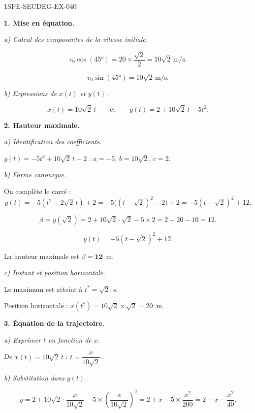 \begin{corrige}{1SPE-SECDEG-EX-040}

\textbf{1. Mise en équation.}

\textit{a) Calcul des composantes de la vitesse initiale.}


\[v_0 \cos(45°) = 20 \times \frac{\sqrt{2}}{2} = 10\sqrt{2}\,\text{m/s}.\]

\[v_0 \sin(45°) = 10\sqrt{2}\,\text{m/s}.\]

\textit{b) Expressions de $x(t)$ et $y(t)$.}

\[x(t) = 10\sqrt{2}\,t \qquad \text{et} \qquad y(t) = 2 + 10\sqrt{2}\,t - 5t^2.\]

\medskip
\textbf{2. Hauteur maximale.}

\textit{a) Identification des coefficients.}


$y(t) = -5t^2 + 10\sqrt{2}\,t + 2$ : $a = -5$, $b = 10\sqrt{2}$, $c = 2$.

\textit{b) Forme canonique.}

On complète le carré :
\[y(t)=-5(t^2-2\sqrt{2}\,t)+2
=-5\bigl((t-\sqrt{2})^2-2\bigr)+2=-5(t-\sqrt{2})^2+12.\]

\[\beta = y(\sqrt{2}) = 2 + 10\sqrt{2} \cdot \sqrt{2} - 5 \times 2 = 2 + 20 - 10 = 12.\]

\[y(t) = -5(t - \sqrt{2})^2 + 12.\]

La hauteur maximale est $\beta = \mathbf{12}$~m.

\textit{c) Instant et position horizontale.}


Le maximum est atteint à $t^* = \sqrt{2}$~s.

Position horizontale : $x(t^*) = 10\sqrt{2} \times \sqrt{2} = 20$~m.

\medskip
\textbf{3. Équation de la trajectoire.}

\textit{a) Exprimer $t$ en fonction de $x$.}


De $x(t) = 10\sqrt{2}\,t$ : $t = \dfrac{x}{10\sqrt{2}}$.

\textit{b) Substitution dans $y(t)$.}

\[y = 2 + 10\sqrt{2} \cdot \frac{x}{10\sqrt{2}} - 5 \times \left(\frac{x}{10\sqrt{2}}\right)^2 = 2 + x - 5 \times \frac{x^2}{200} = 2 + x - \frac{x^2}{40}.\]


\end{corrige}
